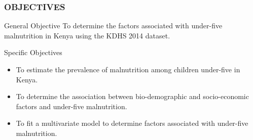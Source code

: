 	\begin{frame}
		\frametitle{OBJECTIVES}
		\begin {block} {General Objective}
		To determine the factors associated with under-five malnutrition in Kenya using the KDHS 2014 dataset.
		\end {block}
		\begin {block} {Specific Objectives}
		\begin{itemize}
			\item To estimate the prevalence of malnutrition among children under-five in Kenya.
			\item To determine the association between bio-demographic and socio-economic factors and under-five malnutrition.
			\item To fit a multivariate model to determine factors associated with under-five malnutrition.
		\end{itemize}
		\end{block}
	\end{frame}
